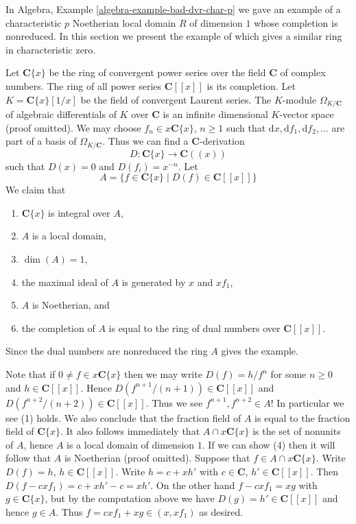\noindent
In Algebra, Example \ref{algebra-example-bad-dvr-char-p} we gave an example
of a characteristic $p$ Noetherian local domain $R$ of dimension $1$
whose completion is nonreduced. In this section we present the example
of \cite[Proposition 3.1]{Ferrand-Raynaud} which gives a similar
ring in characteristic zero.

\medskip\noindent
Let $\mathbf{C}\{x\}$ be the ring of convergent power series over
the field $\mathbf{C}$ of complex numbers. The ring of all power series
$\mathbf{C}[[x]]$ is its completion. Let $K = \mathbf{C}\{x\}[1/x]$
be the field of convergent Laurent series. The $K$-module
$\Omega_{K/\mathbf{C}}$ of algebraic differentials
of $K$ over $\mathbf{C}$ is an infinite dimensional $K$-vector space
(proof omitted). We may choose $f_n \in x\mathbf{C}\{x\}$,
$n \geq 1$ such that
$
\text{d}x, \text{d}f_1, \text{d}f_2, \ldots
$
are part of a basis of $\Omega_{K/\mathbf{C}}$. Thus we can
find a $\mathbf{C}$-derivation
$$
D : \mathbf{C}\{x\} \longrightarrow \mathbf{C}((x))
$$
such that $D(x) = 0$ and $D(f_i) = x^{-n}$. Let
$$
A = \{f \in \mathbf{C}\{x\} \mid D(f) \in \mathbf{C}[[x]]\}
$$
We claim that
\begin{enumerate}
\item $\mathbf{C}\{x\}$ is integral over $A$,
\item $A$ is a local domain,
\item $\dim(A) = 1$,
\item the maximal ideal of $A$ is generated by $x$ and $xf_1$,
\item $A$ is Noetherian, and
\item the completion of $A$ is equal to the ring of dual numbers
over $\mathbf{C}[[x]]$.
\end{enumerate}
Since the dual numbers are nonreduced the ring $A$ gives the example.

\medskip\noindent
Note that if $0 \not = f \in x\mathbf{C}\{x\}$ then
we may write $D(f) = h/f^n$ for some $n \geq 0$ and $h \in \mathbf{C}[[x]]$.
Hence $D(f^{n + 1}/(n + 1)) \in \mathbf{C}[[x]]$
and $D(f^{n + 2}/(n + 2)) \in \mathbf{C}[[x]]$. Thus we
see $f^{n + 1}, f^{n + 2} \in A$!
In particular we see (1) holds. We also conclude that
the fraction field of $A$ is equal to the fraction field of
$\mathbf{C}\{x\}$. It also follows immediately that
$A \cap x\mathbf{C}\{x\}$ is the set of nonunits of $A$, hence
$A$ is a local domain of dimension $1$. If we can show (4)
then it will follow that $A$ is Noetherian (proof omitted).
Suppose that $f \in A \cap x\mathbf{C}\{x\}$. Write
$D(f) = h$, $h \in \mathbf{C}[[x]]$. Write $h = c + xh'$
with $c \in \mathbf{C}$, $h' \in \mathbf{C}[[x]]$. Then
$D(f - cxf_1) = c + xh' - c = xh'$. On the other hand
$f - cxf_1 = xg$ with $g \in \mathbf{C}\{x\}$, but by the
computation above we have $D(g) = h' \in \mathbf{C}[[x]]$
and hence $g \in A$. Thus $f = cxf_1 + xg \in (x, xf_1)$ as desired.

